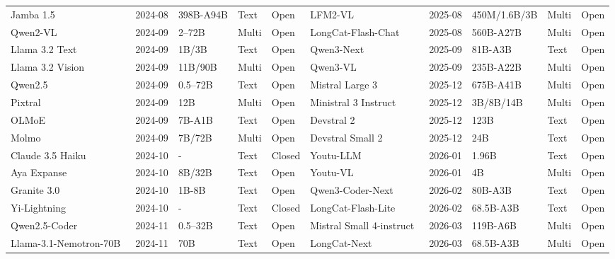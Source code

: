 \begin{table}[!p]
{\begin{tabular}{@{} lllll | lllll @{}}
Jamba 1.5~\cite{team2024jamba} & 2024-08 & 398B-A94B & Text & Open & LFM2-VL~\cite{amini2025lfm2} & 2025-08 & 450M/1.6B/3B & Multi & Open \\
Qwen2-VL~\cite{wang2024qwen2vl} & 2024-09 & 2--72B & Multi & Open & LongCat-Flash-Chat~\cite{team2025longcat} & 2025-08 & 560B-A27B & Multi & Open \\
Llama 3.2 Text~\cite{meta2024llama32} & 2024-09 & 1B/3B & Text & Open & Qwen3-Next~\cite{qwen2025qwen3next80ba3binstruct} & 2025-09 & 81B-A3B & Text & Open \\
Llama 3.2 Vision~\cite{meta2024llama32} & 2024-09 & 11B/90B & Multi & Open & Qwen3-VL~\cite{bai2025qwen3} & 2025-09 & 235B-A22B & Multi & Open \\
Qwen2.5~\cite{qwen2024qwen25} & 2024-09 & 0.5--72B & Text & Open & Mistral Large 3~\cite{mistral2025mistrallarge3} & 2025-12 & 675B-A41B & Multi & Open \\
Pixtral~\cite{agrawal2024pixtral} & 2024-09 & 12B & Multi & Open & Ministral 3 Instruct~\cite{mistral2025mistrallarge3} & 2025-12 & 3B/8B/14B & Multi & Open \\
OLMoE~\cite{muennighoff2025olmoe} & 2024-09 & 7B-A1B & Text & Open & Devstral 2~\cite{mistral2025devstral2} & 2025-12 & 123B & Text & Open \\
Molmo~\cite{muennighoff2025olmoe} & 2024-09 & 7B/72B & Multi & Open & Devstral Small 2~\cite{mistral2025devstral2} & 2025-12 & 24B & Text & Open \\
Claude 3.5 Haiku~\cite{anthropic2024claude35haiku} & 2024-10 & - & Text & Closed & Youtu-LLM~\cite{lu2026youtullmunlockingnativeagentic} & 2026-01 & 1.96B & Text & Open \\
Aya Expanse~\cite{dang2024aya} & 2024-10 & 8B/32B & Text & Open & Youtu-VL~\cite{wei2026youtuvlunleashingvisualpotential} & 2026-01 & 4B & Multi & Open \\
Granite 3.0~\cite{granite2024granite} & 2024-10 & 1B-8B & Text & Open & Qwen3-Coder-Next~\cite{cao2026qwen3} & 2026-02 & 80B-A3B & Text & Open \\
Yi-Lightning~\cite{wake2024yi} & 2024-10 & - & Text & Closed & LongCat-Flash-Lite~\cite{liu2026scaling} & 2026-02 & 68.5B-A3B & Text & Open \\
Qwen2.5-Coder~\cite{qwen2024qwen25coder} & 2024-11 & 0.5--32B & Text & Open & Mistral Small 4-instruct~\cite{mistral2026mistralsmall4instruct} & 2026-03 & 119B-A6B & Multi & Open \\
Llama-3.1-Nemotron-70B~\cite{wang2024helpsteer2} & 2024-11 & 70B & Text & Open & LongCat-Next~\cite{team2026longcat} & 2026-03 & 68.5B-A3B & Multi & Open \\
\bottomrule
\end{tabular}
}

\end{table}
\clearpage
